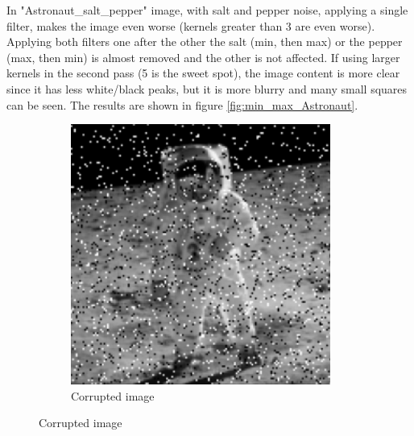 \documentclass{article}
\begin{document}
In "Astronaut\_salt\_pepper" image, with salt and pepper noise, applying a single filter, makes the image even worse (kernels greater than 3 are even worse). Applying both filters one after the other the salt (min, then max) or the pepper (max, then min) is almost removed and the other is not affected. If using larger kernels in the second pass (5 is the sweet spot), the image content is more clear since it has less white/black peaks, but it is more blurry and many small squares can be seen.
The results are shown in figure \ref{fig:min_max_Astronaut}.
\begin{figure}[H]
	\centering
	\begin{subfigure}{0.5\textwidth}
		\includegraphics[width=\textwidth]{Astronaut_salt_pepper.png}
		\caption{Corrupted image}
	\end{subfigure}


\end{figure}
\end{document}
